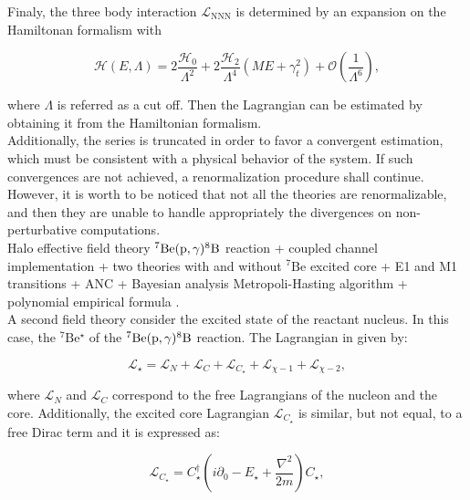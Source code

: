 \documentclass[openany]{book}
\begin{document}
Finaly, the three body interaction $\mathcal{L}_{\mathrm{NNN}}$ is determined by an expansion on the Hamiltonan formalism with 

\begin{equation}\label{eq:micro_EFT_lagrangian_hamiltonianNNN}
	\mathcal{H}(E, \Lambda ) = 2  \frac{\mathcal{H}_0}{\Lambda^2} + 2 \frac{\mathcal{H}_2}{\Lambda^4}(ME + \gamma^2_t) + \mathcal{O} \left( \frac{1}{\Lambda^6} \right),
\end{equation}

where $\Lambda$ is referred as a cut off. Then the Lagrangian can be estimated by obtaining it from the Hamiltonian formalism. \\

Additionally, the series is truncated in order to favor a convergent estimation, which must be consistent with a physical behavior of the system. If such convergences are not achieved, a renormalization procedure shall continue. However, it is worth to be noticed that not all the theories are renormalizable, and then they are unable to handle appropriately the divergences on non-perturbative computations. \\

 Halo effective field theory $\mathrm{{}^{7}Be(p, \gamma){}^{8}B}$ reaction + coupled channel implementation + two theories with and without $\mathrm{{}^{7}Be}$ excited core  + E1 and M1 transitions + ANC + Bayesian analysis Metropoli-Hasting algorithm + polynomial empirical formula  \cite{higa_premarathna_rupak_2022}. \\
 
 A second field theory consider the excited state of the reactant nucleus. In this case, the $\mathrm{{}^{7}Be^{\star}}$ of the $\mathrm{{}^{7}Be(p, \gamma){}^{8}B}$ reaction. The Lagrangian in given by: 
 
 \begin{equation}\label{eq:special_EFT_excited}
 	\mathcal{L}_{\star} = \mathcal{L}_{N} + \mathcal{L}_{C} +  \mathcal{L}_{C_{\star}} +  \mathcal{L}_{\chi-1} +  \mathcal{L}_{\chi-2},
 \end{equation}

where $ \mathcal{L}_{N}$ and $ \mathcal{L}_{C}$ correspond to the free Lagrangians of the nucleon and the core. Additionally, the excited core Lagrangian $\mathcal{L}_{C_\star}$ is similar, but not equal, to a free Dirac term and it is expressed as: 

\begin{equation}\label{eq:special_EFT_excited_star}
	\mathcal{L}_{C_\star} = C^\dagger_{\star} \left(i\partial_0 - E_{\star} + \frac{\nabla^2}{2m}\right) C_{\star},
\end{equation}
\end{document}

